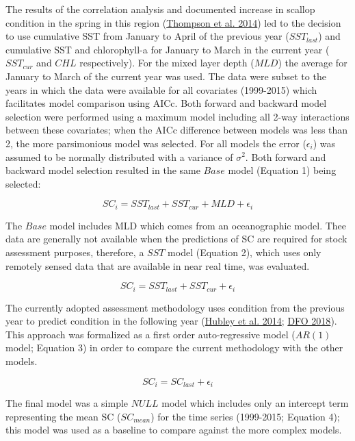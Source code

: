 \documentclass[
]{article}
\begin{document}
The results of the correlation analysis and documented increase in scallop condition in the spring in this region (\protect\hyperlink{ref-thompsonIdentifyingSpawningEvents2014}{Thompson et al. 2014}) led to the decision to use cumulative SST from January to April of the previous year (\(SST_{last}\)) and cumulative SST and chlorophyll-a for January to March in the current year (\(SST_{cur}\) and \(CHL\) respectively). For the mixed layer depth (\(MLD\)) the average for January to March of the current year was used. The data were subset to the years in which the data were available for all covariates (1999-2015) which facilitates model comparison using AICc. Both forward and backward model selection were performed using a maximum model including all 2-way interactions between these covariates; when the AICc difference between models was less than 2, the more parsimonious model was selected. For all models the error (\(\epsilon_i\)) was assumed to be normally distributed with a variance of \(\sigma^2\). Both forward and backward model selection resulted in the same \(Base\) model (Equation 1) being selected:

\begin{equation}  SC_{i} = SST_{last} + SST_{cur} + MLD + \epsilon_i    \end{equation}

The \(Base\) model includes MLD which comes from an oceanographic model. Thee data are generally not available when the predictions of SC are required for stock assessment purposes, therefore, a \(SST\) model (Equation 2), which uses only remotely sensed data that are available in near real time, was evaluated.

\begin{equation}  SC_{i} = SST_{last} + SST_{cur} + \epsilon_i    \end{equation}

The currently adopted assessment methodology uses condition from the previous year to predict condition in the following year (\protect\hyperlink{ref-hubleyGeorgesBankBrowns2014}{Hubley et al. 2014}; \protect\hyperlink{ref-dfoStockStatusUpdate2018}{DFO 2018}). This approach was formalized as a first order auto-regressive model (\(AR(1)\) model; Equation 3) in order to compare the current methodology with the other models.

\begin{equation} SC_{i} = SC_{last} + \epsilon_i    \end{equation}

The final model was a simple \(NULL\) model which includes only an intercept term representing the mean SC (\(SC_{mean}\)) for the time series (1999-2015; Equation 4); this model was used as a baseline to compare against the more complex models.
\end{document}
